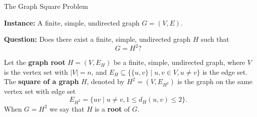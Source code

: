 \documentclass[10pt]{beamer}
\begin{document}
\begin{frame}
\end{frame}

\begin{frame}{The Graph Square Problem}
    \begin{problem}[SQUARE] \label{prob::square_problem}
        \leavevmode

        \textbf{Instance:} A finite, simple, undirected graph $G=(V,E)$.
        \medskip

        \textbf{Question:} Does there exist a finite, simple, undirected graph $H$ such that
        \[
        G = H^2?
        \]
    \end{problem}

    Let the \textbf{graph root} $H = (V, E_H)$ be a finite, simple, undirected graph, where $V$ is the vertex set with $|V| = n$, and $E_H \subseteq \{\{u,v\} \mid u,v \in V, u \neq v\}$ is the edge set.  
    The \textbf{square of a graph} $H$, denoted by $H^2 = (V, E_{H^2})$ is the graph on the same vertex set with edge set
    \begin{equation} \label{eq::fund_def_square}
      E_{H^2} = \{ uv \mid u \neq v, 1 \leq d_H(u,v) \leq 2 \}.
    \end{equation}
    When $G = H^2$ we say that $H$ is a \textbf{root} of $G$. 
\end{frame}
\end{document}
